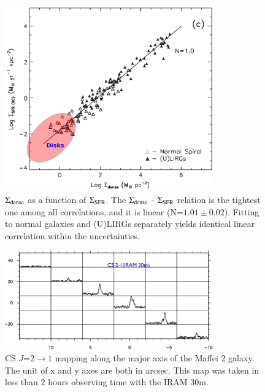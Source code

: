 \documentclass[legal,11pt]{article}
\begin{document}
\begin{figure}
\centering
\includegraphics[width=0.8\textwidth]{HCN_IR.pdf}
\caption{${\rm \Sigma_{dense}}$ as a function of $\Sigma_{\rm SFR}$. The ${\rm \Sigma_{dense}}$ 
        - $\Sigma_{\rm SFR}$ relation is the tightest one among all correlations, 
        and it is linear (N=$1.01 \pm 0.02$). Fitting to normal galaxies and (U)LIRGs separately 
yields identical linear correlation within the uncertainties.} 
\label{fig:hcn-ir}
\end{figure}






\begin{figure}
\centering

\includegraphics[width=0.8\textwidth]{maffei2-1.eps}

\caption{CS $J$=2$\rightarrow 1$ mapping along the major axis of the
Maffei 2 galaxy.  The unit of x and y axes are both in arcsec. This map
was taken in less than 2 hours observing time with the IRAM 30m.}
\label{fig:maffei2}
\end{figure}
\end{document}
